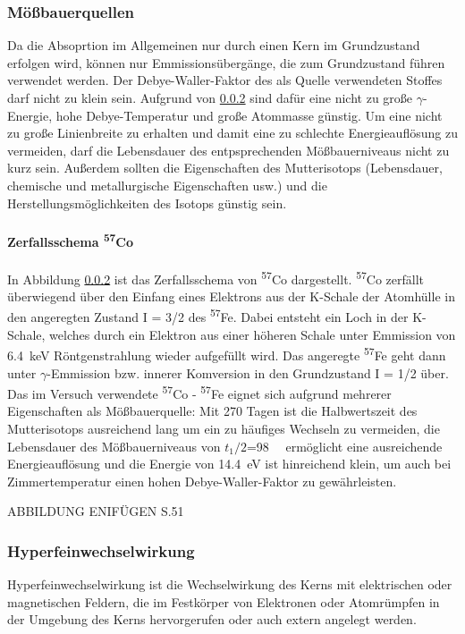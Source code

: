 \documentclass[a4paper,twoside,final]{article}
\begin{document}
\subsubsection{Mößbauerquellen}
Da die Absoprtion im Allgemeinen nur durch einen Kern im Grundzustand erfolgen wird, können nur Emmissionsübergänge, die zum Grundzustand führen verwendet werden. Der Debye-Waller-Faktor des als Quelle verwendeten Stoffes darf nicht zu klein sein. Aufgrund von \ref{} sind dafür eine nicht zu große $\gamma$-Energie, hohe Debye-Temperatur und große Atommasse günstig. Um eine nicht zu große Linienbreite zu erhalten und damit eine zu schlechte Energieauflösung zu vermeiden, darf die Lebensdauer des entpsprechenden Mößbauerniveaus nicht zu kurz sein. Außerdem sollten die Eigenschaften des Mutterisotops (Lebensdauer, chemische und metallurgische Eigenschaften usw.) und die Herstellungsmöglichkeiten des Isotops günstig sein.


\paragraph{Zerfallsschema \textsuperscript{57}Co}
In Abbildung \ref{} ist das Zerfallsschema von \textsuperscript{57}Co dargestellt. \textsuperscript{57}Co zerfällt überwiegend über den Einfang eines Elektrons aus der K-Schale der Atomhülle in den angeregten Zustand I = 3/2 des \textsuperscript{57}Fe. Dabei entsteht ein Loch in der K-Schale, welches durch ein Elektron aus einer höheren Schale unter Emmission von \SI{6,4}{\keV} Röntgenstrahlung wieder aufgefüllt wird. Das angeregte \textsuperscript{57}Fe geht dann unter $\gamma$-Emmission bzw. innerer Komversion in den Grundzustand I = 1/2 über.\\
Das im Versuch verwendete \textsuperscript{57}Co - \textsuperscript{57}Fe eignet sich aufgrund mehrerer Eigenschaften als Mößbauerquelle: Mit 270 Tagen ist die Halbwertszeit des Mutterisotops ausreichend lang um ein zu häufiges Wechseln zu vermeiden, die Lebensdauer des Mößbauerniveaus von $t_1/2$=\SI{98}{\nano\seconds} ermöglicht eine ausreichende Energieauflösung und die Energie von \SI{14,4}{\eV} ist hinreichend klein, um auch bei Zimmertemperatur einen hohen Debye-Waller-Faktor zu gewährleisten.


ABBILDUNG ENIFÜGEN S.51


\subsubsection{Hyperfeinwechselwirkung}
Hyperfeinwechselwirkung ist die Wechselwirkung des Kerns mit elektrischen oder magnetischen Feldern, die im Festkörper von Elektronen oder Atomrümpfen in der Umgebung des Kerns hervorgerufen oder auch extern angelegt werden.
\end{document}
